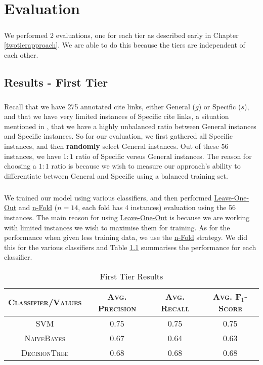 \chapter{Evaluation}
\label{evaluation}
\paragraph{}
We performed 2 evaluations, one for each tier as described early in Chapter \ref{twotierapproach}. We are able to do this because the tiers are independent of each other.

\section{Results - First Tier}
\paragraph{}
Recall that we have 275 annotated cite links, either General ($g$) or Specific ($s$), and that we have very limited instances of Specific cite links, a situation mentioned in \cite{li2010negative}, that we have a highly unbalanced ratio between General instances and Specific instances. So for our evaluation, we first gathered all Specific instances, and then \textbf{randomly} select General instances. Out of these 56 instances, we have $1:1$ ratio of Specific versus General instances. The reason for choosing a $1:1$ ratio is because we wish to measure our approach's ability to differentiate between General and Specific using a balanced training set.

\paragraph{}
We trained our model using various classifiers, and then performed \url{Leave-One-Out} and \url{n-Fold} ($n=14$, each fold has 4 instances) evaluation using the 56 instances. The main reason for using \url{Leave-One-Out} is because we are working with limited instances we wish to maximise them for training. As for the performance when given less training data, we use the \url{n-Fold} strategy. We did this for the various classifiers and Table \ref{tab:firsttieresults} summarises the performance for each classifier.

\begin{table}[h]
	\center
	\begin{tabular}{ c | c  c  c }
		\textsc{Classifier/Values} & \textsc{Avg. Precision} & \textsc{Avg. Recall} & \textsc{Avg. F$_1$-Score} \\
		\hline
		\textsc{SVM} 			& 0.75 & 0.75 & 0.75 \\
		\textsc{NaiveBayes} 	& 0.67 & 0.64 & 0.63 \\
		\textsc{DecisionTree}	& 0.68 & 0.68 & 0.68
	\end{tabular}
	\caption{First Tier Results}
	\label{tab:firsttieresults}
\end{table}

